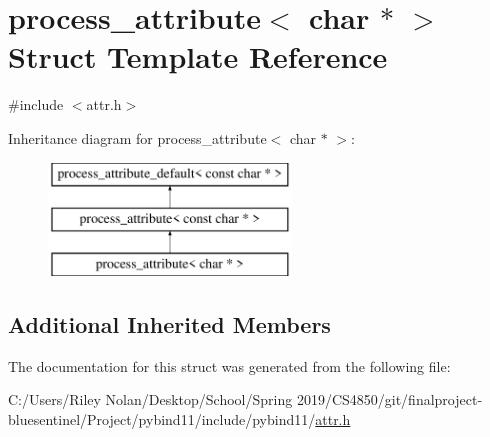 \hypertarget{structprocess__attribute_3_01char_01_5_01_4}{}\section{process\+\_\+attribute$<$ char $\ast$ $>$ Struct Template Reference}
\label{structprocess__attribute_3_01char_01_5_01_4}


{\ttfamily \#include $<$attr.\+h$>$}

Inheritance diagram for process\+\_\+attribute$<$ char $\ast$ $>$\+:\begin{figure}[H]
\begin{center}
\leavevmode
\includegraphics[height=3.000000cm]{structprocess__attribute_3_01char_01_5_01_4}
\end{center}
\end{figure}
\subsection*{Additional Inherited Members}


The documentation for this struct was generated from the following file\+:\begin{DoxyCompactItemize}
\item 
C\+:/\+Users/\+Riley Nolan/\+Desktop/\+School/\+Spring 2019/\+C\+S4850/git/finalproject-\/bluesentinel/\+Project/pybind11/include/pybind11/\mbox{\hyperlink{attr_8h}{attr.\+h}}\end{DoxyCompactItemize}
